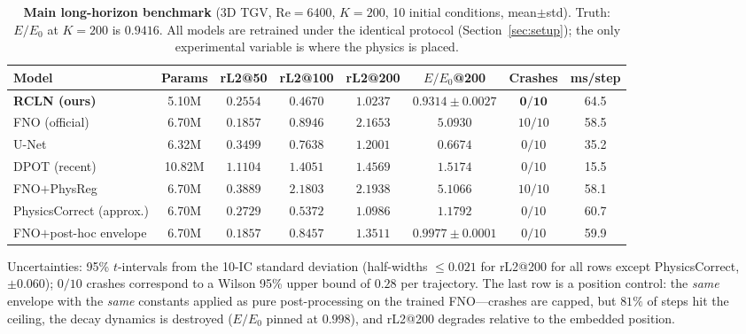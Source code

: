 \documentclass[11pt,a4paper]{article}
\begin{document}
\begin{table}[htbp]
\centering\small
\caption{\textbf{Main long-horizon benchmark} (3D TGV, Re$=6400$, $K{=}200$, 10 initial conditions, mean$\pm$std). Truth: $E/E_0$ at $K{=}200$ is $0.9416$. All models are retrained under the identical protocol (Section~\ref{sec:setup}); the only experimental variable is where the physics is placed.}
\label{tab:main}
\setlength{\tabcolsep}{3pt}
\begin{tabular}{@{}lccccccc@{}}
\toprule
Model & Params & rL2@50 & rL2@100 & rL2@200 & $E/E_0$@200 & Crashes & ms/step \\
\midrule
\textbf{RCLN (ours)} & 5.10M & $\bm{0.2554}$ & $\bm{0.4670}$ & $1.0237$ & $\bm{0.9314\pm0.0027}$ & $\bm{0/10}$ & 64.5 \\
FNO (official) & 6.70M & $0.1857$ & $0.8946$ & $2.1653$ & $5.0930$ & $10/10$ & 58.5 \\
U-Net & 6.32M & $0.3499$ & $0.7638$ & $1.2001$ & $0.6674$ & $0/10$ & 35.2 \\
DPOT (recent) & 10.82M & $1.1104$ & $1.4051$ & $1.4569$ & $1.5174$ & $0/10$ & 15.5 \\
FNO$+$PhysReg & 6.70M & $0.3889$ & $2.1803$ & $2.1938$ & $5.1066$ & $10/10$ & 58.1 \\
PhysicsCorrect (approx.) & 6.70M & $0.2729$ & $0.5372$ & $1.0986$ & $1.1792$ & $0/10$ & 60.7 \\
FNO$+$post-hoc envelope & 6.70M & $0.1857$ & $0.8457$ & $1.3511$ & $0.9977\pm0.0001$ & $0/10$ & 59.9 \\
\bottomrule
\end{tabular}
\vspace{2pt}
\begin{minipage}{\linewidth}\footnotesize
Uncertainties: 95\% $t$-intervals from the 10-IC standard deviation (half-widths $\le0.021$ for rL2@200 for all rows except PhysicsCorrect, $\pm0.060$); $0/10$ crashes correspond to a Wilson 95\% upper bound of $0.28$ per trajectory. The last row is a position control: the \emph{same} envelope with the \emph{same} constants applied as pure post-processing on the trained FNO---crashes are capped, but $81\%$ of steps hit the ceiling, the decay dynamics is destroyed ($E/E_0$ pinned at $0.998$), and rL2@200 degrades relative to the embedded position.
\end{minipage}
\end{table}
\end{document}
